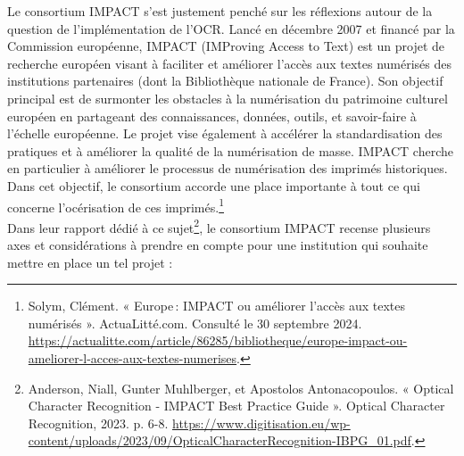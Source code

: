 \documentclass[a4paper,12pt,twoside]{book}
\begin{document}
Le consortium IMPACT s'est justement
penché sur les réflexions autour de la question de l'implémentation de l'OCR. Lancé en décembre 2007 et financé par la Commission européenne, IMPACT (IMProving Access to Text) est un projet de recherche européen visant à faciliter et améliorer l'accès aux textes numérisés des institutions partenaires (dont la Bibliothèque nationale de France). Son objectif principal est de surmonter les obstacles à la numérisation du patrimoine culturel européen en partageant des connaissances, données, outils, et savoir-faire à l'échelle européenne. Le projet vise également à accélérer la standardisation des pratiques et à améliorer la qualité de la numérisation de masse. IMPACT cherche en particulier à améliorer le
processus de numérisation des imprimés historiques. Dans cet objectif, le consortium accorde une place importante à tout ce qui concerne l'océrisation de ces imprimés.\footnote{Solym, Clément. « Europe : IMPACT ou améliorer l’accès aux textes numérisés ». ActuaLitté.com. Consulté le 30 septembre 2024. 
	\url{https://actualitte.com/article/86285/bibliotheque/europe-impact-ou-ameliorer-l-acces-aux-textes-numerises}.} \\


Dans leur rapport dédié à ce
sujet\footnote{Anderson, Niall, Gunter Muhlberger, et Apostolos
	Antonacopoulos. « Optical Character Recognition - IMPACT Best Practice
	Guide ». Optical Character Recognition, 2023. p. 6-8.
	\url{https://www.digitisation.eu/wp-content/uploads/2023/09/OpticalCharacterRecognition-IBPG_01.pdf}.},
le consortium IMPACT recense plusieurs axes et considérations à prendre en compte pour
une institution qui souhaite mettre en place un tel projet : \\
\end{document}
